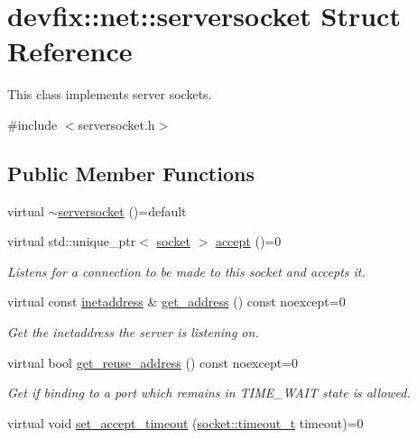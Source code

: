 \hypertarget{structdevfix_1_1net_1_1serversocket}{}\section{devfix\+:\+:net\+:\+:serversocket Struct Reference}
\label{structdevfix_1_1net_1_1serversocket}


This class implements server sockets.  




{\ttfamily \#include $<$serversocket.\+h$>$}

\subsection*{Public Member Functions}
\begin{DoxyCompactItemize}
\item 
virtual \hyperlink{structdevfix_1_1net_1_1serversocket_afd9f315c4018808c790478710f52d8ab}{$\sim$serversocket} ()=default
\item 
virtual std\+::unique\+\_\+ptr$<$ \hyperlink{structdevfix_1_1net_1_1socket}{socket} $>$ \hyperlink{structdevfix_1_1net_1_1serversocket_a7b3ea6aad486060acdd1385a08f7db81}{accept} ()=0
\begin{DoxyCompactList}\small\item\em Listens for a connection to be made to this socket and accepts it. \end{DoxyCompactList}\item 
virtual const \hyperlink{structdevfix_1_1net_1_1inetaddress}{inetaddress} \& \hyperlink{structdevfix_1_1net_1_1serversocket_a087a819b8173bfa101ea65ea8a17eb8c}{get\+\_\+address} () const noexcept=0
\begin{DoxyCompactList}\small\item\em Get the {\itshape inetaddress} the server is listening on. \end{DoxyCompactList}\item 
virtual bool \hyperlink{structdevfix_1_1net_1_1serversocket_a7efdb1f57d0e482542fda50a2403230d}{get\+\_\+reuse\+\_\+address} () const noexcept=0
\begin{DoxyCompactList}\small\item\em Get if binding to a port which remains in T\+I\+M\+E\+\_\+\+W\+A\+IT state is allowed. \end{DoxyCompactList}\item 
virtual void \hyperlink{structdevfix_1_1net_1_1serversocket_ae67a25cf26fe54ce7b10d07ff9219ce7}{set\+\_\+accept\+\_\+timeout} (\hyperlink{structdevfix_1_1net_1_1socket_a80a3bf4cb7292bae31ea9c6575539c68}{socket\+::timeout\+\_\+t} timeout)=0

\end{DoxyCompactItemize}
